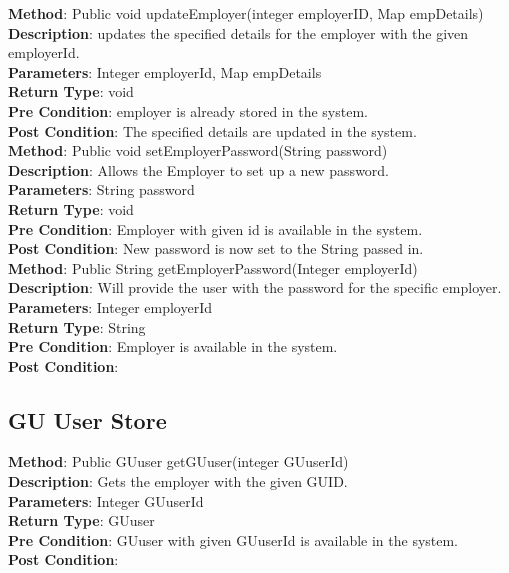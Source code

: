 \documentclass{l3deliverable}
\begin{document}
\textbf{Method}: Public void updateEmployer(integer employerID, Map empDetails)\\
\textbf{Description}: updates the specified details for the employer with the given employerId.\\
\textbf{Parameters}: Integer employerId, Map empDetails\\
\textbf{Return Type}: void\\
\textbf{Pre Condition}: employer is already stored in the system.\\
\textbf{Post Condition}: The specified details are updated in the system.\\


\textbf{Method}: Public void setEmployerPassword(String password) \\
\textbf{Description}: Allows the Employer to set up a new password.\\
\textbf{Parameters}: String password\\
\textbf{Return Type}: void\\
\textbf{Pre Condition}: Employer with given id is available in the system.\\
\textbf{Post Condition}: New password is now set to the String passed in.\\

\textbf{Method}: Public String getEmployerPassword(Integer employerId) \\
\textbf{Description}: Will provide the user with the password for the specific employer.\\
\textbf{Parameters}: Integer employerId\\
\textbf{Return Type}: String \\
\textbf{Pre Condition}: Employer is available in the system.\\
\textbf{Post Condition}:\\

\subsection{GU User Store}

\textbf{Method}: Public GUuser getGUuser(integer GUuserId)\\
\textbf{Description}: Gets the employer with the given GUID.\\
\textbf{Parameters}: Integer GUuserId\\
\textbf{Return Type}: GUuser\\
\textbf{Pre Condition}: GUuser with given GUuserId is available in the system.\\
\textbf{Post Condition}:\\
\end{document}
